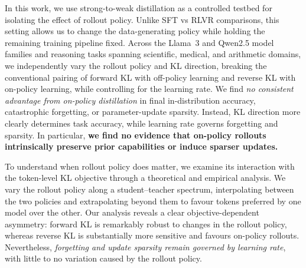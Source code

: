 \documentclass{article} %
\theoremstyle{plain}
\theoremstyle{definition}
\theoremstyle{remark}
\begin{document}
In this work, we use strong-to-weak distillation as a controlled testbed for isolating the effect of rollout policy. Unlike SFT vs RLVR comparisons, this setting allows us to change the data-generating policy while holding the remaining training pipeline fixed. Across the Llama~3 and Qwen2.5 model families and reasoning tasks spanning scientific, medical, and arithmetic domains, we independently vary the rollout policy and KL direction, breaking the conventional pairing of forward KL with off-policy learning and reverse KL with on-policy learning, while controlling for the learning rate. We find \textit{no consistent advantage from on-policy distillation} in final in-distribution accuracy, catastrophic forgetting, or parameter-update sparsity. Instead, KL direction more clearly determines task accuracy, while learning rate governs forgetting and sparsity. In particular, \textbf{we find no evidence that on-policy rollouts intrinsically preserve prior capabilities or induce sparser updates.}

To understand when rollout policy does matter, we examine its interaction with the token-level KL objective through a theoretical and empirical analysis. We vary the rollout policy along a student--teacher spectrum, interpolating between the two policies and extrapolating beyond them to favour tokens preferred by one model over the other. Our analysis reveals a clear objective-dependent asymmetry: forward KL is remarkably robust to changes in the rollout policy, whereas reverse KL is substantially more sensitive and favours on-policy rollouts. Nevertheless, \textit{forgetting and update sparsity remain governed by learning rate}, with little to no variation caused by the rollout policy.
\end{document}
